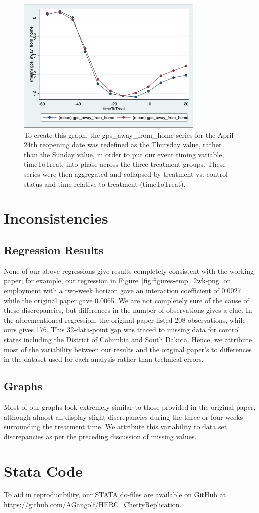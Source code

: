 \documentclass[12pt,letterpaper]{article}
\begin{document}
        \begin{figure}[!ht]
          \centering
          \includegraphics[width=0.8\textwidth]{figures/gps_graph.png}
\caption{To create this graph, the gps\_away\_from\_home series for the April 24th reopening date was redefined as the Thursday value, rather than the Sunday value, in order to put our event timing variable, timeToTreat, into phase across the three treatment groups.  These series were then aggregated and collapsed by treatment vs. control status and time relative to treatment (timeToTreat).}
          \label{fig:figures-gps_graph-png}
        \end{figure}
    \section{Inconsistencies}
      \subsection{Regression Results}
        None of our above regressions give results completely consistent with the working paper; for example, our regression in Figure~\ref{fig:figures-emp_2wk-png} on employment with a two-week horizon gave an interaction coefficient of 0.0027 while the original paper gave 0.0065. We are not completely sure of the cause of these discrepancies, but differences in the number of observations gives a clue.  In the aforementioned regression, the original paper listed 208 observations, while ours gives 176.  This 32-data-point gap was traced to missing data for control states including the District of Columbia and South Dakota.  Hence, we attribute most of the variability between our results and the original paper's to differences in the dataset used for each analysis rather than technical errors.
      \subsection{Graphs}
        Most of our graphs look extremely similar to those provided in the original paper, although almost all display slight discrepancies during the three or four weeks surrounding the treatment time.  We attribute this variability to data set discrepancies as per the preceding discussion of missing values.
      \section{Stata Code}
        To aid in reproducibility, our STATA do-files are available on GitHub at https://github.com/AGangolf/HERC\_ChettyReplication.

        \printbibliography
\end{document}
